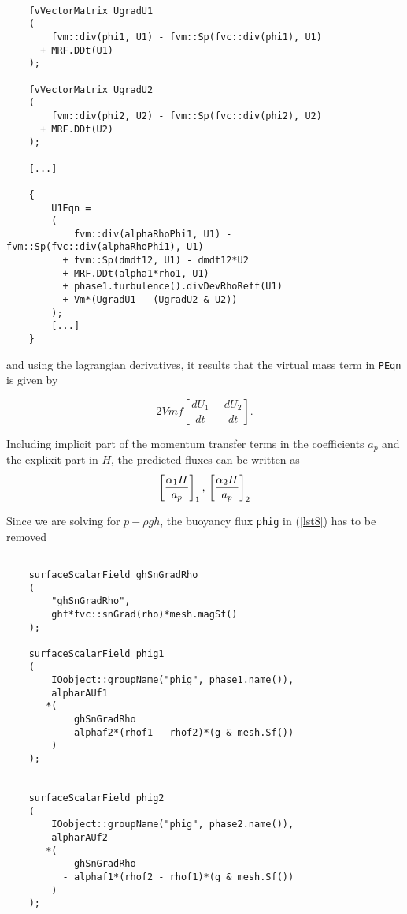 \documentclass[a4paper, 12 pt, fleqn]{article}
\begin{document}
{\begin{lstlisting}[frame=single] 

    fvVectorMatrix UgradU1
    (
        fvm::div(phi1, U1) - fvm::Sp(fvc::div(phi1), U1)
      + MRF.DDt(U1)
    );

    fvVectorMatrix UgradU2
    (
        fvm::div(phi2, U2) - fvm::Sp(fvc::div(phi2), U2)
      + MRF.DDt(U2)
    );
    
    [...]
    
    {
        U1Eqn =
        (
            fvm::div(alphaRhoPhi1, U1) - fvm::Sp(fvc::div(alphaRhoPhi1), U1)
          + fvm::Sp(dmdt12, U1) - dmdt12*U2
          + MRF.DDt(alpha1*rho1, U1)
          + phase1.turbulence().divDevRhoReff(U1)
          + Vm*(UgradU1 - (UgradU2 & U2))            
        );
        [...]
    }

\end{lstlisting}

and using the lagrangian derivatives, it results that the virtual mass term in {\tt PEqn } is given by

\begin{equation}
2 Vmf \left[ \frac{d U_1}{dt} - \frac{d U_2}{dt} \right].
\end{equation}

Including implicit part of the momentum transfer terms in the coefficients $a_p$ and the explixit part in $H$, the predicted fluxes can be written as
\begin{equation}
 \left[ \frac{\alpha_1 H}{a_p} \right]_1, \\
 \left[ \frac{\alpha_2 H}{a_p} \right]_2
\end{equation}

Since we are solving for $p - \rho g h$, the buoyancy flux {\tt phig} in (\ref{lst8}) has to be removed 
\begin{lstlisting}[frame=single] 

    surfaceScalarField ghSnGradRho
    (
        "ghSnGradRho",
        ghf*fvc::snGrad(rho)*mesh.magSf()
    );
    
    surfaceScalarField phig1
    (
        IOobject::groupName("phig", phase1.name()),
        alpharAUf1
       *(
            ghSnGradRho
          - alphaf2*(rhof1 - rhof2)*(g & mesh.Sf())
        )
    );


    surfaceScalarField phig2
    (
        IOobject::groupName("phig", phase2.name()),
        alpharAUf2
       *(
            ghSnGradRho
          - alphaf1*(rhof2 - rhof1)*(g & mesh.Sf())
        )
    );
    

\end{lstlisting}}
\end{document}
